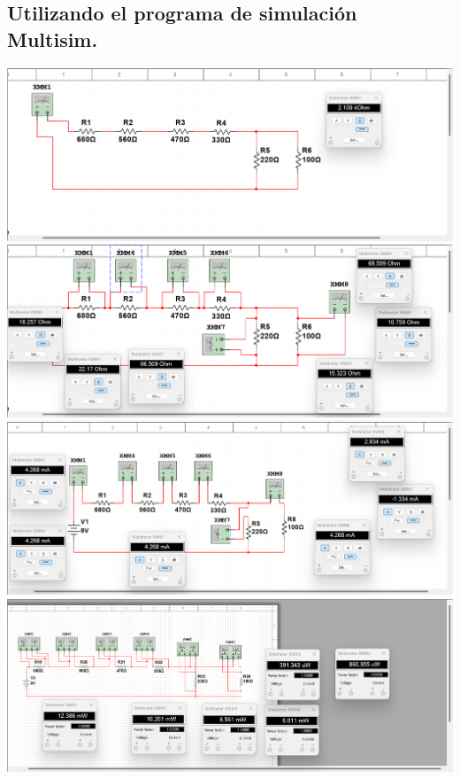 \documentclass[10pt]{article}
\begin{document}
\begin{multicols}{2}
\subsection{Utilizando el programa de simulación Multisim.}
\includegraphics[width=\linewidth]{Imagenes/recistencia eq.png}
\includegraphics[width=\linewidth]{Imagenes/recistencias k.png}
\includegraphics[width=\linewidth]{Imagenes/corriente k.png}
\includegraphics[width=\linewidth]{Imagenes/potencias.png}

\end{multicols}
\end{document}
